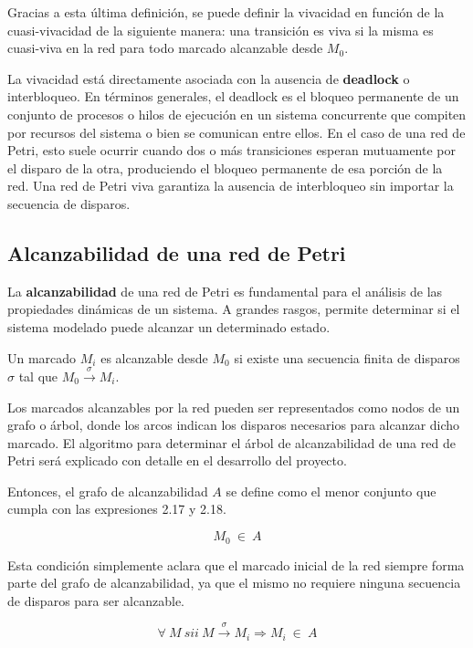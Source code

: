 Gracias a esta última definición, se puede definir la vivacidad en función de la cuasi-vivacidad de la siguiente manera: una transición es viva si la misma es cuasi-viva en la red para todo marcado alcanzable desde $M_0$. \\ \par

\noindent La vivacidad está directamente asociada con la ausencia de \textbf{deadlock} o interbloqueo. En términos generales, el deadlock es el bloqueo permanente de un conjunto de procesos o hilos de ejecución en un sistema concurrente que compiten por recursos del sistema o bien se comunican entre ellos. En el caso de una red de Petri, esto suele ocurrir cuando dos o más transiciones esperan mutuamente por el disparo de la otra, produciendo el bloqueo permanente de esa porción de la red. 
Una red de Petri viva garantiza la ausencia de interbloqueo sin importar la secuencia de disparos.


\subsection{Alcanzabilidad de una red de Petri}
La \textbf{alcanzabilidad} de una red de Petri es fundamental para el análisis de las propiedades dinámicas de un sistema. A grandes rasgos, permite determinar si el sistema modelado puede alcanzar un determinado estado.


Un marcado $M_i$ es alcanzable desde $M_0$ si existe una secuencia finita de disparos $\sigma$ tal que $M_0 \xrightarrow{\sigma} M_i$.

Los marcados alcanzables por la red pueden ser representados como nodos de un grafo o árbol, donde los arcos indican los disparos necesarios para alcanzar dicho marcado. El algoritmo para determinar el árbol de alcanzabilidad de una red de Petri será explicado con detalle en el desarrollo del proyecto.

Entonces, el grafo de alcanzabilidad $A$ se define como el menor conjunto que cumpla con las expresiones 2.17 y 2.18.

\begin{equation}
    M_0 \ \in \ A
\end{equation}

\noindent Esta condición simplemente aclara que el marcado inicial de la red siempre forma parte del grafo de alcanzabilidad, ya que el mismo no requiere ninguna secuencia de disparos para ser alcanzable.

\begin{equation}
    \forall \ M \ sii \ M \xrightarrow{\sigma} M_i \Rightarrow M_i \ \in \ A
\end{equation}


